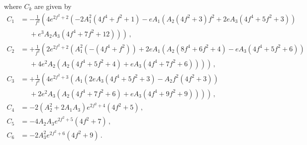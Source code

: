 \documentclass[12pt]{article}
\begin{document}
where $C_k$ are given by
\begin{equation} \label{eq:supergravity:Vslow3Coefficients}
  \begin{aligned}
    C_1 &= -\frac{1}{f^2} \left(4 e^{2 f^2 + 2} \left(
      - 2 A_1^2 \left(4 f^4 + f^2 + 1\right)
      - e A_1 \left(A_2 \left(4 f^2 + 3\right) f^2
      + 2 e A_3 \left(4 f^4 + 5 f^2 + 3\right)\right)\right.\right.\\
      &~~~~~~ \left.\left.{} + e^3 A_2 A_3 \left(4 f^4 + 7 f^2 + 12\right)
    \right)\right)\,,\\
    C_2 &= +\frac{1}{f^2} \left(2 e^{2 f^2 + 2} \left(
        A_1^2 \left(-\left(4 f^4 + f^2\right)\right)
      + 2 e A_1 \left(
          A_2 \left(8 f^4 + 6 f^2 + 4\right)
        - e A_3 \left(4 f^4 + 5 f^2 + 6\right)
      \right)\right.\right.\\
      &~~~~~~ \left.\left.{} + 4 e^2 A_2 \left(
          A_2 \left(4 f^4 + 5 f^2 + 4\right)
        + e A_3 \left(4 f^4 + 7 f^2 + 6\right)
      \right)\right)\right)\,,\\
    C_3 &= +\frac{1}{f^2}\left(4 e^{2 f^2 + 3} \left(
      A_1 \left(
          2 e A_3 \left(4 f^4 + 5 f^2 + 3\right)
        - A_2 f^2 \left(4 f^2 + 3\right)
      \right)\right.\right.\\
      &~~~~~~ \left.\left.{} + 2 e^2 A_3 \left(
          A_2 \left(4 f^4 + 7 f^2 + 6\right)
        + e A_3 \left(4 f^4 + 9 f^2 + 9\right)
      \right)\right)\right)\,,\\
    C_4 &= -2 \left(A_2^2 + 2 A_1 A_3\right) e^{2 f^2 + 4} \left(4 f^2 + 5\right)\,,\\
    C_5 &= -4 A_2 A_3 e^{2 f^2 + 5} \left(4 f^2 + 7 \right)\,,\\
    C_6 &= -2 A_3^2 e^{2 f^2 + 6} \left(4 f^2 + 9\right)\,.
  \end{aligned}
\end{equation}

\end{document}
